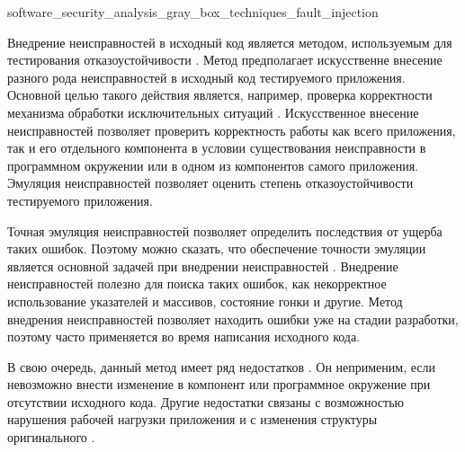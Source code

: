 
	{software_security_analysis_gray_box_techniques_fault_injection}

%
Внедрение неисправностей в исходный код является методом, используемым для тестирования 
отказоустойчивости  . 
%
Метод предполагает искусственне внесение разного рода неисправностей в исходный код тестируемого 
приложения. 
%
Основной целью такого действия является, например, проверка корректности механизма обработки 
исключительных ситуаций . 
%
Искусственное внесение неисправностей позволяет проверить корректность работы как всего приложения, 
так и его отдельного компонента в условии существования неисправности в программном окружении или 
в одном из компонентов самого приложения. 
%
Эмуляция неисправностей  позволяет оценить степень отказоустойчивости 
тестируемого приложения.

%
Точная  эмуляция неисправностей позволяет определить последствия от ущерба таких ошибок. 
%
Поэтому можно сказать, что обеспечение точности эмуляции является основной задачей при внедрении 
неисправностей . 
%
Внедрение неисправностей полезно для поиска таких ошибок, как некорректное использование указателей 
и массивов, состояние гонки и другие. 
%
Метод внедрения неисправностей позволяет находить ошибки уже на стадии разработки, поэтому часто 
применяется  во время написания исходного кода.

%
В свою очередь, данный метод имеет ряд недостатков . 
%
Он неприменим, если невозможно внести изменение в компонент или программное окружение 
при отсутствии исходного кода. 
%
Другие недостатки связаны с возможностью нарушения рабочей нагрузки приложения и с изменения 
структуры оригинального .